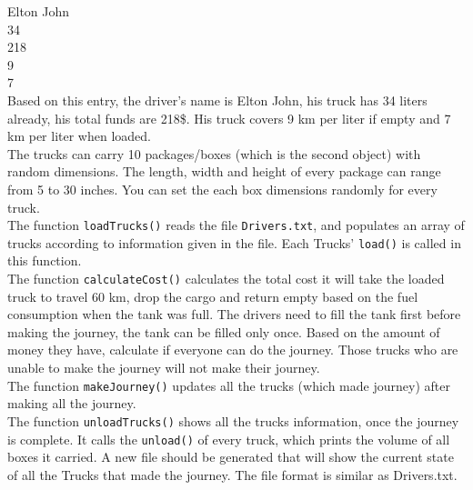 \documentclass[a4paper,12pt]{article}
\begin{document}
	\noindent Elton John\\
	34\\
	218\\
	9\\
	7\\
	
	

	\noindent Based on this entry, the driver's name is Elton John, his truck has 34 liters already, his total funds are	218\$. His truck covers 9 km per liter if empty and 7 km per liter when loaded.\\

	\noindent The trucks can carry 10 packages/boxes (which is the second object) with random dimensions. The length, width and height of every package can range from 5 to 30 inches. You can set the each box dimensions randomly for every truck. \smallskip\\
	
	\noindent The function \texttt{loadTrucks()} reads the file \texttt{Drivers.txt}, and populates an array of trucks according to information given in the file. Each Trucks' \texttt{load()} is called in this function. \smallskip\\
	
	\noindent The function \texttt{calculateCost()} calculates the total cost it will take the loaded truck to travel 60 km, drop the cargo and return empty based on the fuel consumption when the tank was full. The drivers need to fill the tank first before making the journey, the tank can be filled only once. Based on the amount of money they have, calculate if everyone can do the journey. Those trucks who are unable to make the journey will not make their journey.\\
	
	\noindent The function \texttt{makeJourney()} updates all the trucks (which made journey) after making all the journey.\\
	
	\noindent The function \texttt{unloadTrucks()} shows all the trucks information, once the journey is complete. It calls the \texttt{unload()} of every truck, which prints the volume of all boxes it carried. A new file  should be generated that will show the current state of all the Trucks that made the journey. The file format is similar as Drivers.txt.\smallskip\\	

	
	
\end{document}
